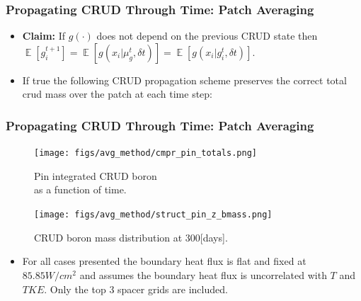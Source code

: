 \documentclass[t, pdftex]{beamer}
\DeclareMathOperator*{\E}{\mathbb{E}}
\begin{document}
\begin{frame}[shrink=5]
\frametitle{Propagating CRUD Through Time:  Patch Averaging}
\begin{itemize}
\item  \textbf{Claim:} If $g(\cdot)$ does not depend on the previous CRUD state then $\E[ g_i^{t+1}] =  \E[ g(x_i| \mu_g^{t}, \delta t)] = \E[ g( x_i| g_{i}^{t}, \delta t)]$.
\item If true the following CRUD propagation scheme preserves the correct total crud mass over the patch at each time step:
\begin{algorithm}[H]
\end{algorithm}
\end{itemize}
\end{frame}

\begin{frame}[shrink=10]
\frametitle{Propagating CRUD Through Time: Patch Averaging}
\begin{figure}[!htbp]
\centering
\begin{minipage}{.5\textwidth}
  \texttt{[image: figs/avg\_method/cmpr\_pin\_totals.png]}
\caption{Pin integrated CRUD boron \\ as a function of time.} 
\label{fig:crud_pre_map}
\end{minipage}%
\begin{minipage}{.5\textwidth}
  \texttt{[image: figs/avg\_method/struct\_pin\_z\_bmass.png]}
\caption{CRUD boron mass distribution at 300[days].}
\label{fig:crud_post_map}
\end{minipage}
\end{figure}
\begin{itemize}
\item \small For all cases presented the boundary heat flux is flat and fixed at $85.85 W/cm^2$ and assumes the boundary heat flux is uncorrelated with $T$ and $TKE$.  Only the top 3 spacer grids are included.
\end{itemize}
\end{frame}
\end{document}
